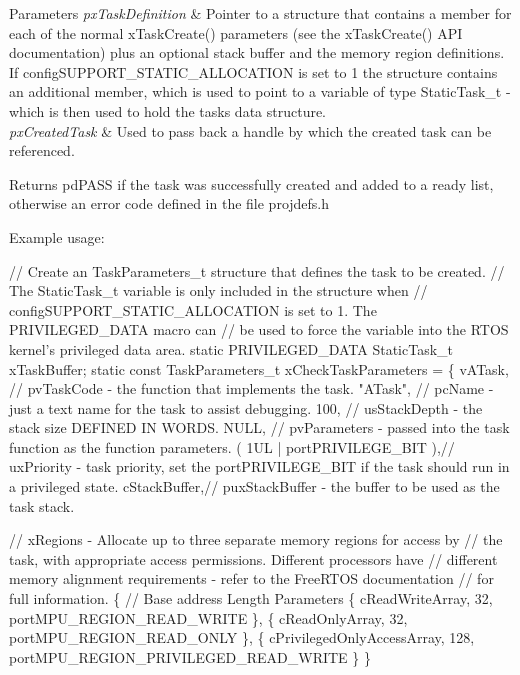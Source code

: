 \begin{DoxyParams}{Parameters}
{\em px\+Task\+Definition} & Pointer to a structure that contains a member for each of the normal x\+Task\+Create() parameters (see the x\+Task\+Create() A\+PI documentation) plus an optional stack buffer and the memory region definitions. If config\+S\+U\+P\+P\+O\+R\+T\+\_\+\+S\+T\+A\+T\+I\+C\+\_\+\+A\+L\+L\+O\+C\+A\+T\+I\+ON is set to 1 the structure contains an additional member, which is used to point to a variable of type Static\+Task\+\_\+t -\/ which is then used to hold the task\textquotesingle{}s data structure.\\
\hline
{\em px\+Created\+Task} & Used to pass back a handle by which the created task can be referenced.\\
\hline
\end{DoxyParams}
\begin{DoxyReturn}{Returns}
pd\+P\+A\+SS if the task was successfully created and added to a ready list, otherwise an error code defined in the file projdefs.\+h
\end{DoxyReturn}
Example usage\+: 
\begin{DoxyPre}
// Create an TaskParameters\_t structure that defines the task to be created.
// The StaticTask\_t variable is only included in the structure when
// configSUPPORT\_STATIC\_ALLOCATION is set to 1.  The PRIVILEGED\_DATA macro can
// be used to force the variable into the RTOS kernel's privileged data area.
static PRIVILEGED\_DATA StaticTask\_t xTaskBuffer;
static const TaskParameters\_t xCheckTaskParameters =
\{
    vATask,     // pvTaskCode - the function that implements the task.
    "ATask",    // pcName - just a text name for the task to assist debugging.
    100,        // usStackDepth - the stack size DEFINED IN WORDS.
    NULL,       // pvParameters - passed into the task function as the function parameters.
    ( 1UL | portPRIVILEGE\_BIT ),// uxPriority - task priority, set the portPRIVILEGE\_BIT if the task should run in a privileged state.
    cStackBuffer,// puxStackBuffer - the buffer to be used as the task stack.\end{DoxyPre}



\begin{DoxyPre}    // xRegions - Allocate up to three separate memory regions for access by
    // the task, with appropriate access permissions.  Different processors have
    // different memory alignment requirements - refer to the FreeRTOS documentation
    // for full information.
    \{
        // Base address                 Length  Parameters
        \{ cReadWriteArray,              32,     portMPU\_REGION\_READ\_WRITE \},
        \{ cReadOnlyArray,               32,     portMPU\_REGION\_READ\_ONLY \},
        \{ cPrivilegedOnlyAccessArray,   128,    portMPU\_REGION\_PRIVILEGED\_READ\_WRITE \}
    \}\end{DoxyPre}



